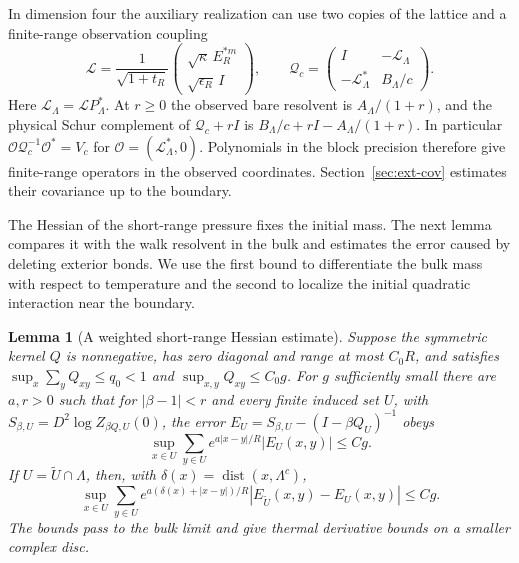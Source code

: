 \documentclass[11pt]{article}
\newtheorem{lemma}[theorem]{Lemma}
\theoremstyle{definition}
\begin{document}
In dimension four the auxiliary realization can use two copies
of the lattice and a finite-range observation coupling
\begin{equation}
 \mathcal L=\frac{1}{\sqrt{1+t_R}}
 \begin{pmatrix}\sqrt\kappa\, E_R^{*m}\\ \sqrt{\epsilon_R}\,I\end{pmatrix},
 \qquad
 \mathcal Q_c=\begin{pmatrix}I&-\mathcal L_\Lambda\\
                     -\mathcal L_\Lambda^*&B_\Lambda/c
       \end{pmatrix}.
\end{equation}
Here \(\mathcal L_\Lambda=\mathcal L P_\Lambda^*\). At \(r\ge0\)
the observed bare resolvent is \(A_\Lambda/(1+r)\), and the
physical Schur complement of \(\mathcal Q_c+rI\) is
\(B_\Lambda/c+rI-A_\Lambda/(1+r)\). In particular
\(\mathcal O\mathcal Q_c^{-1}\mathcal O^*=V_c\) for
\(\mathcal O=(\mathcal L_\Lambda^*,0)\). Polynomials in the block precision therefore give finite-range
operators in the observed coordinates. Section~\ref{sec:ext-cov}
estimates their covariance up to the boundary.

The Hessian of the short-range pressure fixes the initial mass.
The next lemma compares it with the walk resolvent in the bulk and
estimates the error caused by deleting exterior bonds. We use the
first bound to differentiate the bulk mass with respect to temperature
and the second to localize the initial quadratic interaction near the
boundary.

\begin{lemma}[A weighted short-range Hessian estimate]
\label{lem:extension-cavity}
Suppose the symmetric kernel \(Q\) is nonnegative, has zero
diagonal and range at most \(C_0R\), and satisfies
\(\sup_x\sum_y Q_{xy}\le q_0<1\) and \(\sup_{x,y}Q_{xy}\le C_0 g\).
For \(g\) sufficiently small there are \(a,r>0\) such that for
\(|\beta-1|<r\) and every finite induced set \(U\), with
\(S_{\beta,U}=D^2\log Z_{\beta Q,U}(0)\), the error
\(E_U=S_{\beta,U}-(I-\beta Q_U)^{-1}\) obeys
\begin{equation}
 \sup_{x\in U}\sum_{y\in U}
      e^{a|x-y|/R}|E_U(x,y)|\le Cg .
\end{equation}
If \(U=\widetilde U\cap\Lambda\), then, with
\(\delta(x)=\operatorname{dist}(x,\Lambda^c)\),
\begin{equation}
 \sup_{x\in U}\sum_{y\in U}
 e^{a(\delta(x)+|x-y|)/R}
 |E_{\widetilde U}(x,y)-E_U(x,y)|\le Cg .
\end{equation}
The bounds pass to the bulk limit and give thermal derivative
bounds on a smaller complex disc.
\end{lemma}
\end{document}
